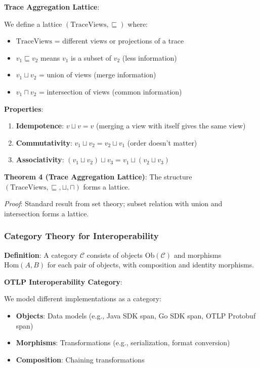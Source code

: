 \textbf{Trace Aggregation Lattice}:

We define a lattice $(\text{TraceViews}, \sqsubseteq)$ where:

\begin{itemize}
\item $\text{TraceViews}$ = different views or projections of a trace
\item $v_1 \sqsubseteq v_2$ means $v_1$ is a subset of $v_2$ (less information)
\item $v_1 \sqcup v_2$ = union of views (merge information)
\item $v_1 \sqcap v_2$ = intersection of views (common information)
\end{itemize}

\textbf{Properties}:

\begin{enumerate}
\item \textbf{Idempotence}: $v \sqcup v = v$ (merging a view with itself gives the same view)
\item \textbf{Commutativity}: $v_1 \sqcup v_2 = v_2 \sqcup v_1$ (order doesn't matter)
\item \textbf{Associativity}: $(v_1 \sqcup v_2) \sqcup v_3 = v_1 \sqcup (v_2 \sqcup v_3)$
\end{enumerate}

\textbf{Theorem 4 (Trace Aggregation Lattice)}:
The structure $(\text{TraceViews}, \sqsubseteq, \sqcup, \sqcap)$ forms a lattice.

\emph{Proof}: Standard result from set theory; subset relation with union and intersection forms a lattice.

\subsubsection{Category Theory for Interoperability}

\textbf{Definition}: A category $\mathcal{C}$ consists of objects $\text{Ob}(\mathcal{C})$ and morphisms $\text{Hom}(A, B)$ for each pair of objects, with composition and identity morphisms.

\textbf{OTLP Interoperability Category}:

We model different \otlp implementations as a category:

\begin{itemize}
\item \textbf{Objects}: Data models (e.g., Java SDK span, Go SDK span, OTLP Protobuf span)
\item \textbf{Morphisms}: Transformations (e.g., serialization, format conversion)
\item \textbf{Composition}: Chaining transformations
\end{itemize}

